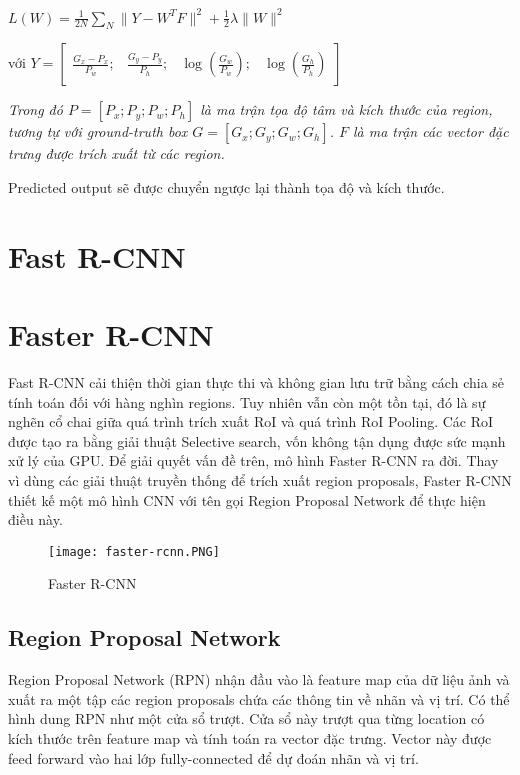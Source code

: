 \documentclass[../thesis.tex]{subfiles}
\begin{document}
$L(W) = \displaystyle\frac{1}{2N}\displaystyle\sum_{N}^{}\|Y - W^TF\|^2 + \frac{1}{2}\lambda\|W\|^2$

với $Y = 
\begin{bmatrix}
	\displaystyle\frac{G_x - P_x}{P_w}; & \displaystyle\frac{G_y - P_y}{P_h}; & \log\left(\displaystyle\frac{G_w}{P_w}\right); & \log\left(\displaystyle\frac{G_h}{P_h}\right)
\end{bmatrix}
$

\textit{Trong đó $P = \left[P_x; P_y; P_w; P_h\right]$ là ma trận tọa độ tâm và kích thước của region, tương tự với ground-truth box $G = \left[G_x; G_y; G_w; G_h\right]$. $F$ là ma trận các vector đặc trưng được trích xuất từ các region.}

Predicted output sẽ được chuyển ngược lại thành tọa độ và kích thước. 

\section{Fast R-CNN}


\section{Faster R-CNN}

Fast R-CNN cải thiện thời gian thực thi và không gian lưu trữ bằng cách chia sẻ tính toán đối với hàng nghìn regions. Tuy nhiên vẫn còn một tồn tại, đó là sự nghẽn cổ chai giữa quá trình trích xuất RoI và quá trình RoI Pooling. Các RoI được tạo ra bằng giải thuật Selective search, vốn không tận dụng được sức mạnh xử lý của GPU. Để giải quyết vấn đề trên, mô hình Faster R-CNN ra đời. Thay vì dùng các giải thuật truyền thống để trích xuất region proposals, Faster R-CNN thiết kế một mô hình CNN với tên gọi Region Proposal Network để thực hiện điều này.

\begin{figure}[H]
	\centering
	\texttt{[image: faster-rcnn.PNG]}
	\caption{Faster R-CNN}\label{Fig:faster_rcnn}
\end{figure}

\subsection{Region Proposal Network}

Region Proposal Network (RPN) nhận đầu vào là feature map của dữ liệu ảnh và xuất ra một tập các region proposals chứa các thông tin về nhãn và vị trí. Có thể hình dung RPN như một cửa sổ trượt. Cửa sổ này trượt qua từng location có kích thước  trên feature map và tính toán ra vector đặc trưng. Vector này được feed forward vào hai lớp fully-connected để dự đoán nhãn và vị trí.
\end{document}
